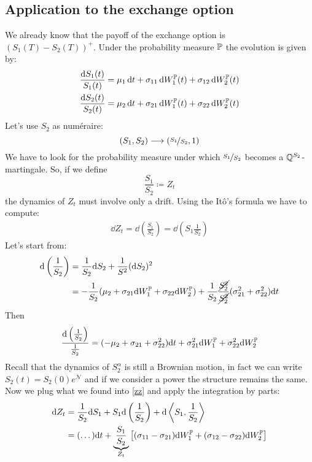 \subsection{Application to the exchange option}
We already know that the payoff of the exchange option is $(S_1(T)-S_2(T))^+$. Under the probability measure $\mathbb{P}$ the evolution is given by:
\begin{align}
    \dfrac{\dd S_1(t)}{S_1(t)} &= \mu_1\,\dd t + \sigma_{11}\,\dd W_1^{\mathbb{P}}(t) + \sigma_{12}\,\dd W_2^{\mathbb{P}}(t) \\
    \dfrac{\dd S_2(t)}{S_2(t)} &= \mu_2\,\dd t + \sigma_{21}\,\dd W_1^{\mathbb{P}}(t) + \sigma_{22}\,\dd W_2^{\mathbb{P}}(t)
\end{align}
Let's use $S_2$ as numéraire:
\begin{equation}
    (S_1,S_2)\longrightarrow(\nicefrac{S_1}{S_2}, 1)
\end{equation}
We have to look for the probability measure under which $\nicefrac{S_1}{S_2}$ becomes a $\mathbb{Q}^{S_2}$-martingale. So, if we define
\begin{equation}
    \frac{S_1}{S_2} \coloneqq Z_t
\end{equation}
the dynamics of $Z_t$ must involve only a drift. Using the Itô's formula we have to compute:
\begin{align}\label{zz}
    \dd Z_t = \dd\left(\frac{S_1}{S_2}\right) = \dd\left(S_1\frac{1}{S_2}\right)
\end{align}
Let's start from:
\begin{align*}
    \dd\left(\frac{1}{S_2}\right) &= \dfrac{1}{S_2}\dd S_2 + \dfrac{1}{S^2}(\dd S_2)^2 \\
    &=
    -\frac{1}{S_2}(\mu_2 + \sigma_{21}\dd W_1^{\mathbb{P}} + \sigma_{22}\dd W_2^{\mathbb{P}}) + \dfrac{1}{S_2}\dfrac{\cancel{S_2^2}}{\cancel{S_2^2}}(\sigma_{21}^2+ \sigma_{22}^2)\dd t 
\end{align*}
Then 
\begin{equation*}
    \frac{\dd\left(\frac{1}{S_2}\right)}{\frac{1}{S_2}} = (-\mu_2 + \sigma_{21} + \sigma_{22}^2)\dd t + \sigma_{21}^2\dd W_1^{\mathbb{P}} + \sigma_{22}^2 \dd W_2^{\mathbb{P}}
\end{equation*}
Recall that the dynamics of $S_2^{\alpha}$ is still a Brownian motion, in fact we can write $S_2(t) = S_2(0)e^{\mathcal{N}}$ and if we consider a power the structure remains the same. Now we plug what we found into \eqref{zz} and apply the integration by parts:
\begin{align}
    \notag \dd Z_t &= \dfrac{1}{S_2}\dd S_1 + S_1\dd \left(\frac{1}{S_2}\right) + \dd\expval{S_1,\frac{1}{S_2}} \\
    &= 
    \notag (\dots)\dd t + \underbrace{\frac{S_1}{S_2}}_{Z_t}\left[(\sigma_{11}- \sigma_{21})\dd W_1^{\mathbb{P}} + (\sigma_{12}- \sigma_{22})\dd W_2^{\mathbb{P}}\right]
\end{align}
